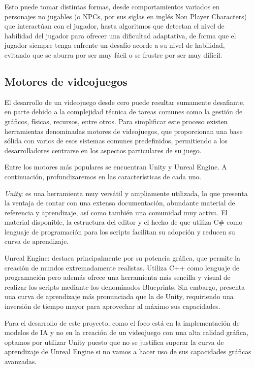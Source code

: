 \documentclass[a4paper]{article}
\begin{document}
Esto puede tomar distintas formas, desde comportamientos variados en personajes no jugables (o NPCs, por sus siglas en inglés Non Player Characters) que interactúan con el jugador, hasta algoritmos que detectan el nivel de habilidad del jugador para ofrecer una dificultad adaptativa, de forma que el jugador siempre tenga enfrente un desafío acorde a su nivel de habilidad, evitando que se aburra por ser muy fácil o se frustre por ser muy difícil.

\subsection{Motores de videojuegos}

El desarrollo de un videojuego desde cero puede resultar sumamente desafiante, en parte debido a la complejidad técnica de tareas comunes como la gestión de gráficos, físicas, recursos, entre otros. Para simplificar este proceso existen herramientas denominadas motores de videojuegos, que proporcionan una base sólida con varios de esos sistemas comunes predefinidos, permitiendo a los desarrolladores centrarse en los aspectos particulares de su juego.

Entre los motores más populares se encuentran Unity y Unreal Engine. A continuación, profundizaremos en las características de cada uno.

\textit{Unity}: es una herramienta muy versátil y ampliamente utilizada, lo que presenta la ventaja de contar con una extensa documentación, abundante material de referencia y aprendizaje, así como también una comunidad muy activa. El material disponible, la estructura del editor y el hecho de que utiliza C\# como lenguaje de programación para los scripts facilitan su adopción y reducen su curva de aprendizaje.

Unreal Engine: destaca principalmente por su potencia gráfica, que permite la creación de mundos extremadamente realistas. Utiliza C++ como lenguaje de programación pero además ofrece una herramienta más sencilla y visual de realizar los scripts mediante los denominados Blueprints.
Sin embargo, presenta una curva de aprendizaje más pronunciada que la de Unity, requiriendo una inversión de tiempo mayor para aprovechar al máximo sus capacidades.

Para el desarrollo de este proyecto, como el foco está en la implementación de modelos de IA y no en la creación de un videojuego con una alta calidad gráfica, optamos por utilizar Unity puesto que no se justifica superar la curva de aprendizaje de Unreal Engine si no vamos a hacer uso de sus capacidades gráficas avanzadas.
\end{document}
